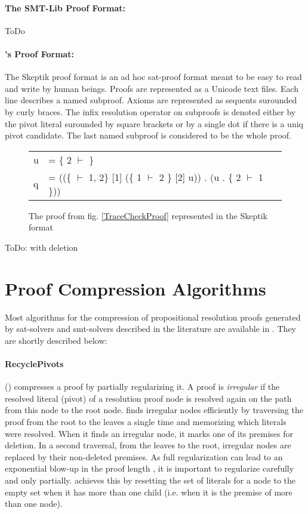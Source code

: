 \documentclass{llncs}
\begin{document}
\paragraph{The SMT-Lib Proof Format: }

{\veriT}

ToDo


\paragraph{{\skeptik}'s Proof Format: }

The Skeptik proof format is an ad hoc sat-proof format meant to be easy to read and write by human
beings. Proofs are represented as a Unicode text files. Each line describes a named subproof.
Axioms are represented as sequents surounded by curly braces. The infix resolution operator on
subproofs is denoted either by the pivot literal surounded by square brackets or by a single dot if
there is a uniq pivot candidate. The last named subproof is considered to be the whole proof.

\begin{figure}
  \centering
  \begin{tabular}{ll}
    u &= \{ 2 $\vdash$ \} \\
    q &= ((\{ $\vdash$ 1, 2\} [1] (\{ 1 $\vdash$ 2 \} [2] u)) . (u . \{ 2 $\vdash$ 1 \}))
  \end{tabular}
  \caption{The proof from fig. \ref{TraceCheckProof} represented in the Skeptik format}
  \label{SkeptikProof}
\end{figure}

ToDo: with deletion


\section{Proof Compression Algorithms}

Most algorithms for the compression of propositional resolution proofs generated by sat-solvers and smt-solvers described in the literature are available in {\skeptik}. They are shortly described below:

\paragraph{RecyclePivots} () \cite{RP08,RP11} compresses a proof by partially regularizing it. A proof is \emph{irregular} \cite{Tseitin} if the resolved literal (pivot) of a resolution proof node is resolved again on the path from this node to the root node.  finds irregular nodes efficiently by traversing the proof from the root to the leaves a single time and memorizing which literals were resolved. When it finds an irregular node, it marks one of its premises for deletion. In a second traversal, from the leaves to the root, irregular nodes are replaced by their non-deleted premises. As full regularization can lead to an exponential blow-up in the proof length \cite{Goerdt}, it is important to regularize carefully and only partially.  achieves this by resetting the set of literals for a node to the empty set when it has more than one child (i.e. when it is the premise of more than one node).
\end{document}
